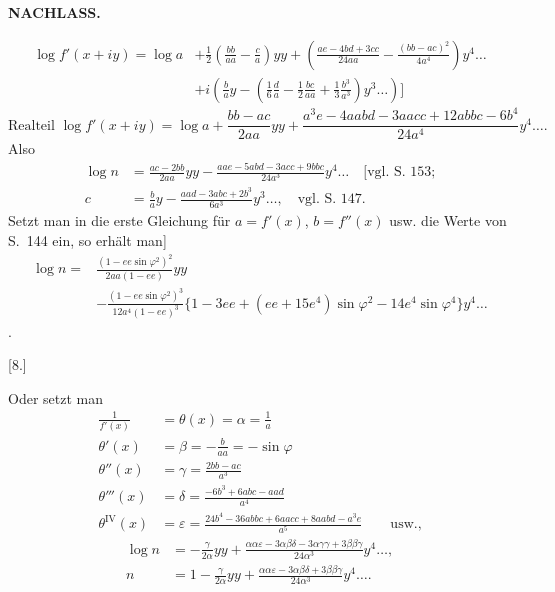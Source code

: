 \par\clearpage
\noindent{}\hfill{\small\textbf{NACHLASS.}}\hfill\null\par\medskip

\[
\begin{aligned}
\log f'(x+iy)=\log a
 &+\tfrac12\left(\frac{bb}{aa}-\frac ca\right)yy
 +\left(\frac{ae-4bd+3cc}{24aa}-\frac{(bb-ac)^2}{4a^4}\right)y^4\ldots\\
 &+i\left(\frac ba y-\left(\tfrac16\frac da-\tfrac12\frac{bc}{aa}
 +\tfrac13\frac{b^3}{a^3}\right)y^3\ldots\right)\mathclose{]}
\end{aligned}
\]
\[
\text{Realteil }\log f'(x+iy)=\log a+\frac{bb-ac}{2aa}yy
+\frac{a^3e-4aabd-3aacc+12abbc-6b^4}{24a^4}y^4\ldots.
\]
\noindent Also
\[
\begin{aligned}
\log n&=\frac{ac-2bb}{2aa}yy-\frac{aae-5abd-3acc+9bbc}{24a^3}y^4\ldots
 \quad\text{[vgl. S.\ 153;}\\
c&=\frac ba y-\frac{aad-3abc+2b^3}{6a^3}y^3\ldots,
 \quad\text{vgl. S.\ 147.}
\end{aligned}
\]
\noindent Setzt man in die erste Gleichung für \(a=f'(x)\), \(b=f''(x)\) usw. die
Werte von S.\ 144 ein, so erhält man]
\[
\begin{aligned}
\log n={}&\frac{(1-ee\sin\varphi^2)^2}{2aa(1-ee)}yy\\
 &-\frac{(1-ee\sin\varphi^2)^3}{12a^4(1-ee)^3}
 \{1-3ee+(ee+15e^4)\sin\varphi^2-14e^4\sin\varphi^4\}y^4\ldots
\end{aligned}
\]
.

\begin{center}[8.]\end{center}
Oder setzt man
\[
\begin{aligned}
\frac1{f'(x)}&=\theta(x)=\alpha=\frac1a\\
\theta'(x)&=\beta=-\frac b{aa}=-\sin\varphi\\
\theta''(x)&=\gamma=\frac{2bb-ac}{a^3}\\
\theta'''(x)&=\delta=\frac{-6b^3+6abc-aad}{a^4}\\
\theta^{\mathrm{IV}}(x)&=\varepsilon
=\frac{24b^4-36abbc+6aacc+8aabd-a^3e}{a^5}\qquad\text{usw.,}
\end{aligned}
\]
\noindent [so wird]
\[
\begin{aligned}
\log n&=-\frac{\gamma}{2\alpha}yy+
 \frac{\alpha\alpha\varepsilon-3\alpha\beta\delta-3\alpha\gamma\gamma+3\beta\beta\gamma}{24\alpha^3}
 y^4\ldots,\\
n&=1-\frac{\gamma}{2\alpha}yy+
 \frac{\alpha\alpha\varepsilon-3\alpha\beta\delta+3\beta\beta\gamma}{24\alpha^3}
 y^4\ldots.
\end{aligned}
\]

